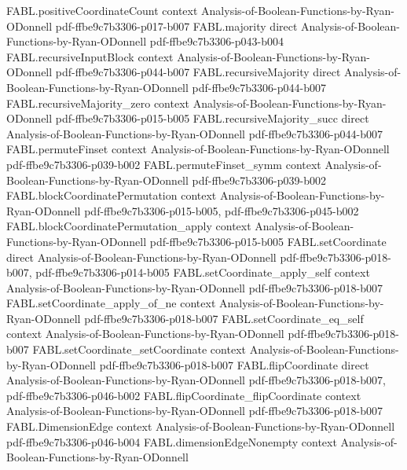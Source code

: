 \begin{theorem}
\proofstep
  {FABL.positiveCoordinateCount}
  {context}
  {Analysis-of-Boolean-Functions-by-Ryan-ODonnell}
  {pdf-ffbe9c7b3306-p017-b007}
\proofstep
  {FABL.majority}
  {direct}
  {Analysis-of-Boolean-Functions-by-Ryan-ODonnell}
  {pdf-ffbe9c7b3306-p043-b004}
\proofstep
  {FABL.recursiveInputBlock}
  {context}
  {Analysis-of-Boolean-Functions-by-Ryan-ODonnell}
  {pdf-ffbe9c7b3306-p044-b007}
\proofstep
  {FABL.recursiveMajority}
  {direct}
  {Analysis-of-Boolean-Functions-by-Ryan-ODonnell}
  {pdf-ffbe9c7b3306-p044-b007}
\proofstep
  {FABL.recursiveMajority_zero}
  {context}
  {Analysis-of-Boolean-Functions-by-Ryan-ODonnell}
  {pdf-ffbe9c7b3306-p015-b005}
\proofstep
  {FABL.recursiveMajority_succ}
  {direct}
  {Analysis-of-Boolean-Functions-by-Ryan-ODonnell}
  {pdf-ffbe9c7b3306-p044-b007}
\proofstep
  {FABL.permuteFinset}
  {context}
  {Analysis-of-Boolean-Functions-by-Ryan-ODonnell}
  {pdf-ffbe9c7b3306-p039-b002}
\proofstep
  {FABL.permuteFinset_symm}
  {context}
  {Analysis-of-Boolean-Functions-by-Ryan-ODonnell}
  {pdf-ffbe9c7b3306-p039-b002}
\proofstep
  {FABL.blockCoordinatePermutation}
  {context}
  {Analysis-of-Boolean-Functions-by-Ryan-ODonnell}
  {pdf-ffbe9c7b3306-p015-b005,
    pdf-ffbe9c7b3306-p045-b002}
\proofstep
  {FABL.blockCoordinatePermutation_apply}
  {context}
  {Analysis-of-Boolean-Functions-by-Ryan-ODonnell}
  {pdf-ffbe9c7b3306-p015-b005}
\proofstep
  {FABL.setCoordinate}
  {direct}
  {Analysis-of-Boolean-Functions-by-Ryan-ODonnell}
  {pdf-ffbe9c7b3306-p018-b007,
    pdf-ffbe9c7b3306-p014-b005}
\proofstep
  {FABL.setCoordinate_apply_self}
  {context}
  {Analysis-of-Boolean-Functions-by-Ryan-ODonnell}
  {pdf-ffbe9c7b3306-p018-b007}
\proofstep
  {FABL.setCoordinate_apply_of_ne}
  {context}
  {Analysis-of-Boolean-Functions-by-Ryan-ODonnell}
  {pdf-ffbe9c7b3306-p018-b007}
\proofstep
  {FABL.setCoordinate_eq_self}
  {context}
  {Analysis-of-Boolean-Functions-by-Ryan-ODonnell}
  {pdf-ffbe9c7b3306-p018-b007}
\proofstep
  {FABL.setCoordinate_setCoordinate}
  {context}
  {Analysis-of-Boolean-Functions-by-Ryan-ODonnell}
  {pdf-ffbe9c7b3306-p018-b007}
\proofstep
  {FABL.flipCoordinate}
  {direct}
  {Analysis-of-Boolean-Functions-by-Ryan-ODonnell}
  {pdf-ffbe9c7b3306-p018-b007,
    pdf-ffbe9c7b3306-p046-b002}
\proofstep
  {FABL.flipCoordinate_flipCoordinate}
  {context}
  {Analysis-of-Boolean-Functions-by-Ryan-ODonnell}
  {pdf-ffbe9c7b3306-p018-b007}
\proofstep
  {FABL.DimensionEdge}
  {context}
  {Analysis-of-Boolean-Functions-by-Ryan-ODonnell}
  {pdf-ffbe9c7b3306-p046-b004}
\proofstep
  {FABL.dimensionEdgeNonempty}
  {context}
  {Analysis-of-Boolean-Functions-by-Ryan-ODonnell}

\end{theorem}
